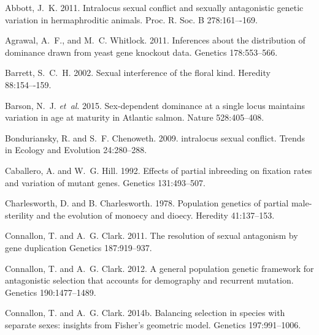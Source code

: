 \documentclass{article}
\begin{document}
\begin{thebibliography}{}

Abbott, J.~K. 2011.
\newblock Intralocus sexual conflict and sexually antagonistic genetic variation in hermaphroditic animals.
\newblock Proc. R. Soc. B 278:161–-169.

Agrawal, A.~F., and M.~C. Whitlock. 2011.
\newblock Inferences about the distribution of dominance drawn from yeast gene knockout data.
\newblock Genetics 178:553--566.

Barrett, S.~C.~H. 2002.
\newblock Sexual interference of the floral kind.
\newblock Heredity 88:154–-159.

Barson, N.~J. \textit{et~al}. 2015.
\newblock Sex-dependent dominance at a single locus maintains variation in age at maturity in Atlantic salmon.
\newblock Nature 528:405--408.

Bonduriansky, R. and S.~F. Chenoweth. 2009.
\newblock intralocus sexual conflict.
\newblock Trends in Ecology and Evolution 24:280--288.

Caballero, A. and W.~G. Hill. 1992.
\newblock Effects of partial inbreeding on fixation rates and variation of mutant genes.
\newblock Genetics 131:493--507.

Charlesworth, D. and B. Charlesworth. 1978.
\newblock Population genetics of partial male-sterility and the evolution of monoecy and dioecy.
\newblock Heredity 41:137--153.

Connallon, T. and A.~G. Clark. 2011.
\newblock The resolution of sexual antagonism by gene duplication
\newblock Genetics 187:919--937.

Connallon, T. and A.~G. Clark. 2012.
\newblock A general population genetic framework for antagonistic selection that accounts for demography and recurrent mutation.
\newblock Genetics 190:1477--1489.

Connallon, T. and A.~G. Clark. 2014b.
\newblock Balancing selection in species with separate sexes: insights from Fisher's geometric model.
\newblock Genetics 197:991--1006.


\end{thebibliography}
\end{document}
